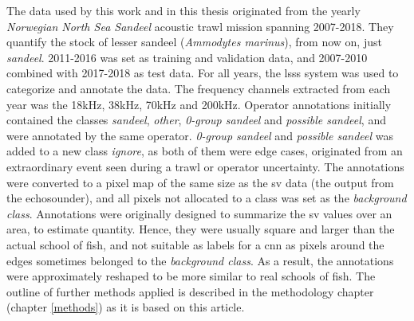     The data used by this work and in this thesis originated from the yearly \textit{Norwegian North Sea Sandeel} acoustic trawl mission spanning 2007-2018\cite{brautaset2020acoustic}. They quantify the stock of lesser sandeel (\textit{Ammodytes marinus}), from now on, just \textit{sandeel}. 2011-2016 was set as training and validation data, and 2007-2010 combined with 2017-2018 as test data. For all years, the \gls{lsss} system was used to categorize and annotate the data. The frequency channels extracted from each year was the 18kHz, 38kHz, 70kHz and 200kHz. Operator annotations initially contained the classes \textit{sandeel}, \textit{other}, \textit{0-group sandeel} and \textit{possible sandeel}, and were annotated by the same operator. \textit{0-group sandeel} and \textit{possible sandeel} was added to a new class \textit{ignore}, as both of them were edge cases, originated from an extraordinary event seen during a trawl or operator uncertainty. The annotations were converted to a pixel map of the same size as the \gls{sv} data (the output from the echosounder), and all pixels not allocated to a class was set as the \textit{background class}. Annotations were originally designed to summarize the \gls{sv} values over an area, to estimate quantity. Hence, they were usually square and larger than the actual school of fish, and not suitable as labels for a \gls{cnn} as pixels around the edges sometimes belonged to the \textit{background class}. As a result, the annotations were approximately reshaped to be more similar to real schools of fish. The outline of further methods applied is described in the methodology chapter (chapter \ref{methods}) as it is based on this article.
    
